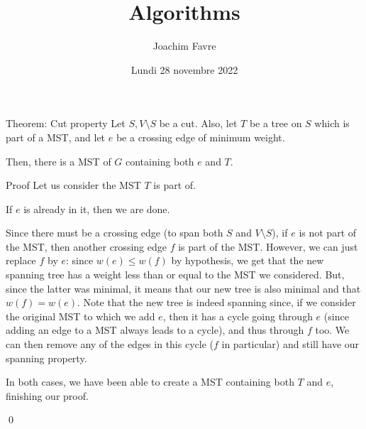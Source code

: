 \documentclass[a4paper]{article}
\title{Algorithms}
\author{Joachim Favre}
\date{Lundi 28 novembre 2022}
\begin{document}
\maketitle


\begin{parag}{Theorem: Cut property}
    Let $S, V \setminus S$ be a cut. Also, let $T$ be a tree on $S$ which is part of a MST, and let $e$ be a crossing edge of minimum weight.

    Then, there is a MST of $G$ containing both $e$ and $T$.

    
    \begin{subparag}{Proof}
        Let us consider the MST $T$ is part of.

        If $e$ is already in it, then we are done.

        Since there must be a crossing edge (to span both $S$ and $V \setminus S$), if $e$ is not part of the MST, then another crossing edge $f$ is part of the MST. However, we can just replace $f$ by $e$: since $w\left(e\right) \leq w\left(f\right)$ by hypothesis, we get that the new spanning tree has a weight less than or equal to the MST we considered. But, since the latter was minimal, it means that our new tree is also minimal and that $w\left(f\right) = w\left(e\right)$. Note that the new tree is indeed spanning since, if we consider the original MST to which we add $e$, then it has a cycle going through $e$ (since adding an edge to a MST always leads to a cycle), and thus through $f$ too. We can then remove any of the edges in this cycle ($f$ in particular) and still have our spanning property.

        In both cases, we have been able to create a MST containing both $T$ and $e$, finishing our proof.

        \qed
    \end{subparag}
\end{parag}
\end{document}
